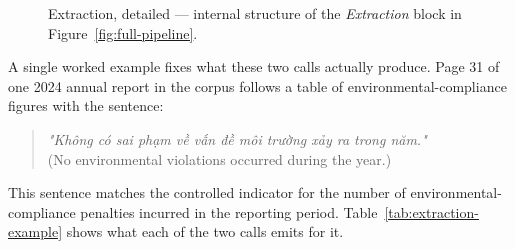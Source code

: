 \documentclass[fontsize=12pt,oneside,headings=small]{scrreprt}
\begin{document}
\begin{figure}[H]
{%
  }
  \caption[Extraction, detailed]{Extraction, detailed --- internal structure
    of the \emph{Extraction} block in Figure~\ref{fig:full-pipeline}.}
  \label{fig:extraction-detail}
\end{figure}

A single worked example fixes what these two calls actually produce. Page 31 of one 2024 annual report in the corpus follows a table of environmental-compliance figures with the sentence:
\begin{quote}
  \emph{"Không có sai phạm về vấn đề môi trường xảy ra trong năm."}\\
  (No environmental violations occurred during the year.)
\end{quote}
This sentence matches the controlled indicator for the number of environmental-compliance penalties incurred in the reporting period. Table~\ref{tab:extraction-example} shows what each of the two calls emits for it.
\end{document}
